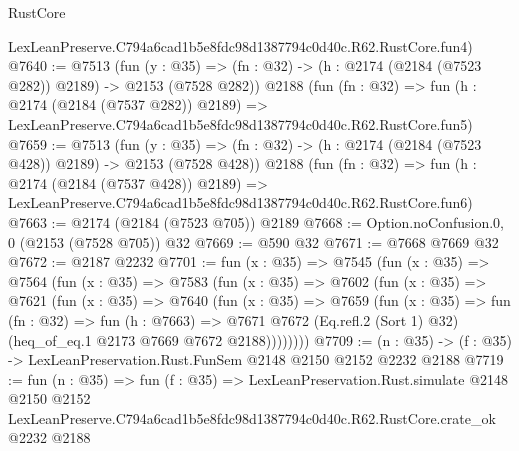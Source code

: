 \begin{lexlean}{RustCore}
\begin{coremodule}
    LexLeanPreserve.C794a6cad1b5e8fdc98d1387794c0d40c.R62.RustCore.fun4)
@7640 := @7513
    (fun (y : @35) => (fn : @32) -> (h : @2174 (@2184 (@7523 @282)) @2189) -> @2153 (@7528 @282))
    @2188
    (fun (fn : @32) =>
    fun (h : @2174 (@2184 (@7537 @282)) @2189) =>
    LexLeanPreserve.C794a6cad1b5e8fdc98d1387794c0d40c.R62.RustCore.fun5)
@7659 := @7513
    (fun (y : @35) => (fn : @32) -> (h : @2174 (@2184 (@7523 @428)) @2189) -> @2153 (@7528 @428))
    @2188
    (fun (fn : @32) =>
    fun (h : @2174 (@2184 (@7537 @428)) @2189) =>
    LexLeanPreserve.C794a6cad1b5e8fdc98d1387794c0d40c.R62.RustCore.fun6)
@7663 := @2174 (@2184 (@7523 @705)) @2189
@7668 := Option.noConfusion.{0, 0} (@2153 (@7528 @705)) @32
@7669 := @590 @32
@7671 := @7668 @7669 @32
@7672 := @2187 @2232
@7701 := fun (x : @35) =>
  @7545
    (fun (x : @35) =>
    @7564
      (fun (x : @35) =>
      @7583
        (fun (x : @35) =>
        @7602
          (fun (x : @35) =>
          @7621
            (fun (x : @35) =>
            @7640
              (fun (x : @35) =>
              @7659
                (fun (x : @35) =>
                fun (fn : @32) =>
                fun (h : @7663) =>
                @7671
                  @7672
                  (Eq.refl.{2} (Sort 1) @32)
                  (heq_of_eq.{1} @2173 @7669 @7672 @2188))))))))
@7709 := (n : @35) -> (f : @35) -> LexLeanPreservation.Rust.FunSem @2148 @2150 @2152 @2232 @2188
@7719 := fun (n : @35) =>
  fun (f : @35) =>
  LexLeanPreservation.Rust.simulate
    @2148
    @2150
    @2152
    LexLeanPreserve.C794a6cad1b5e8fdc98d1387794c0d40c.R62.RustCore.crate_ok
    @2232
    @2188
\end{coremodule}
\end{lexlean}
